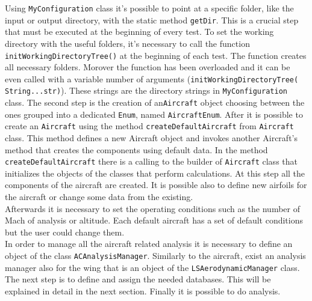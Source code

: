 Using  \texttt{MyConfiguration} class it's possible to point at a specific folder, like the input or output directory, with the static method  \texttt{getDir}. This is a crucial step that must be executed at the beginning of every test.
To set the working directory with the useful folders, it's necessary to call the function \texttt{initWorkingDirectoryTree()} at the beginning of each test. The function creates all necessary folders. Morover the function has been overloaded and it can be even called with a variable number of arguments (\texttt{initWorkingDirectoryTree( String...str)}). These strings are the directory strings in \texttt{MyConfiguration} class.
The second step is the creation of an\texttt{Aircraft} object choosing between the ones grouped into a dedicated \texttt{Enum}, named \texttt{AircraftEnum}.
After it is possible to create an \texttt{Aircraft} using the method \texttt{createDefaultAircraft} from \texttt{Aircraft} class. This method defines a new Aircraft object and invokes another Aircraft's method that creates the components using default data. In the method \texttt{createDefaultAircraft} there is a calling to the builder of \texttt{Aircraft} class that initializes the objects of the classes that perform calculations. At this step all the components of the aircraft are created. It is possible also to define new airfoils for the aircraft or change some data from the existing. \\
Afterwards it is necessary to set the operating conditions such as the number of Mach of analysis or altitude. Each default aircraft has a set of default conditions but the user could change them.\\
In order to manage all the aircraft related analysis it is necessary to define an object of the class  \texttt{ACAnalysisManager}. Similarly to the aircraft,  exist an analysis manager also for the wing that is an object of the  \texttt{LSAerodynamicManager} class. \\
The next step is to define and assign the needed databases. This will be explained in detail in the next section. Finally it is possible to do analysis.

